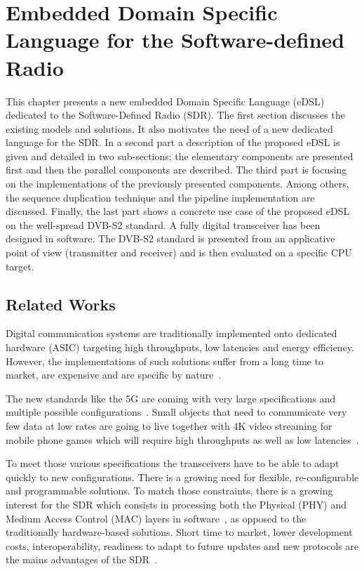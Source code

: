 
\renewcommand{\curChapter}{main/chapter5}

\chapter{Embedded Domain Specific Language for the Software-defined Radio}
\label{chap:sdr}

This chapter presents a new embedded Domain Specific Language (eDSL) dedicated
to the Software-Defined Radio (SDR). The first section discusses the existing
models and solutions. It also motivates the need of a new dedicated language for
the SDR. In a second part a description of the proposed eDSL is given and
detailed in two sub-sections: the elementary components are presented first and
then the parallel components are described. The third part is focusing on the
implementations of the previously presented components. Among others, the
sequence duplication technique and the pipeline implementation are discussed.
Finally, the last part shows a concrete use case of the proposed eDSL on the
well-spread DVB-S2 standard. A fully digital transceiver has been designed in
software. The DVB-S2 standard is presented from an applicative point of view
(transmitter and receiver) and is then evaluated on a specific CPU target.

\vspace*{\fill}
\minitoccustom
\vspace*{\fill}

\section{Related Works}

Digital communication systems are traditionally implemented onto dedicated
hardware (ASIC) targeting high throughputs, low latencies and energy efficiency.
However, the implementations of such solutions suffer from a long time to
market, are expensive and are specific by nature~\cite{Palkovic2010,
Palkovic2012}.

The new standards like the 5G are coming with very large specifications and
multiple possible configurations~\cite{ETSI2018}. Small objects that need to
communicate very few data at low rates are going to live together with 4K video
streaming for mobile phone games which will require high throughputs as well as
low latencies~\cite{Rost2014}.

To meet those various specifications the transceivers have to be able to adapt
quickly to new configurations. There is a growing need for flexible,
re-configurable and programmable solutions. To match those constraints, there is
a growing interest for the SDR which consists in processing both the Physical
(PHY) and Medium Access Control (MAC) layers in software~\cite{Mitola1993}, as
opposed to the traditionally hardware-based solutions. Short time to market,
lower development costs, interoperability, readiness to adapt to future updates
and new protocols are the mains advantages of the SDR~\cite{Akeela2018}.

